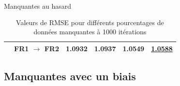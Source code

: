 \documentclass{beamer}
\begin{document}
\begin{frame}{Manquantes au hasard}
\begin{center}
{\begin{minipage}{1.2\linewidth}
\begin{table}[H]
\begin{tabular}{| c | c | c | c | c | c |}
                                                & FR1 $\rightarrow$ FR2 & 1.0932 & 1.0937 & \textbf{1.0549} & \underline{1.0588} \\
                        \hline 
                    \end{tabular}
                \caption{Valeurs de RMSE pour différents pourcentages de données manquantes à 1000 itérations}    
                \end{table}
            \end{minipage}%
        }
    \end{center}
\end{frame}


\subsection{Manquantes avec un biais}
\end{document}
